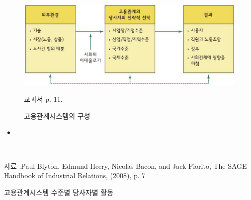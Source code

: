 \documentclass[aspectratio=169,xcolor=dvipsnames,handout]{beamer}
\begin{document}
\begin{frame}
    \begin{figure}
        \centering
        \includegraphics[width=.95\textwidth]{pic/고용관계시스템 구성.png}
        \\
        \raggedright %
        \hspace{1em} %
        \tiny{교과서 p. 11.} %
        \caption{고용관계시스템의 구성}
    \end{figure}
    \begin{itemize}
        \item 
    \end{itemize}
\end{frame}

\begin{frame}
    \scriptsize
    \begin{table}
        \centering
        \resizebox{.95\textwidth}{!}{
            
        }
        \\
        \raggedright %
        \hspace{1em} %
        \tiny{자료 :Paul Blyton, Edmund Heery, Nicolas Bacon, and Jack Fiorito, The SAGE Handbook of Industrial Relations, (2008), p. 7} %
        \caption{고용관계시스템 수준별 당사자별 활동}
    \end{table}
\end{frame}


\end{document}
